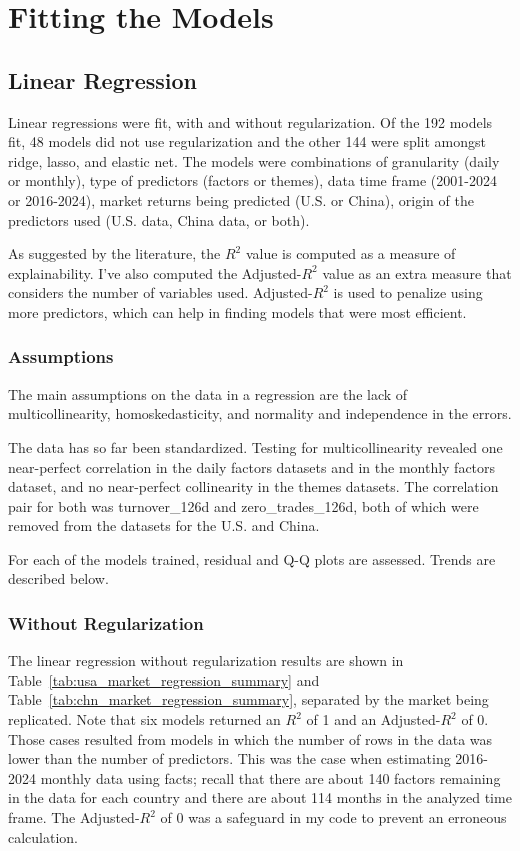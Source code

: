 \chapter{Fitting the Models}

\section{Linear Regression}

Linear regressions were fit, with and without regularization. Of the 192 models fit, 48 models did not use regularization and the other 144 were split amongst ridge, lasso, and elastic net. The models were combinations of granularity (daily or monthly), type of predictors (factors or themes), data time frame (2001-2024 or 2016-2024), market returns being predicted (U.S. or China), origin of the predictors used (U.S. data, China data, or both).

As suggested by the literature, the $R^2$ value is computed as a measure of explainability. I've also computed the Adjusted-$R^2$ value as an extra measure that considers the number of variables used. Adjusted-$R^2$ is used to penalize using more predictors, which can help in finding models that were most efficient.

\subsection{Assumptions}

The main assumptions on the data in a regression are the lack of multicollinearity, homoskedasticity, and normality and independence in the errors. 

The data has so far been standardized. Testing for multicollinearity revealed one near-perfect correlation in the daily factors datasets and in the monthly factors dataset, and no near-perfect collinearity in the themes datasets. The correlation pair for both was turnover\_126d and zero\_trades\_126d, both of which were removed from the datasets for the U.S. and China.

For each of the models trained, residual and Q-Q plots are assessed. Trends are described below.

\subsection{Without Regularization}

The linear regression without regularization results are shown in Table~\ref{tab:usa_market_regression_summary} and Table~\ref{tab:chn_market_regression_summary}, separated by the market being replicated. Note that six models returned an $R^2$ of 1 and an Adjusted-$R^2$ of 0. Those cases resulted from models in which the number of rows in the data was lower than the number of predictors. This was the case when estimating 2016-2024 monthly data using facts; recall that there are about 140 factors remaining in the data for each country and there are about 114 months in the analyzed time frame. The Adjusted-$R^2$ of 0 was a safeguard in my code to prevent an erroneous calculation.

